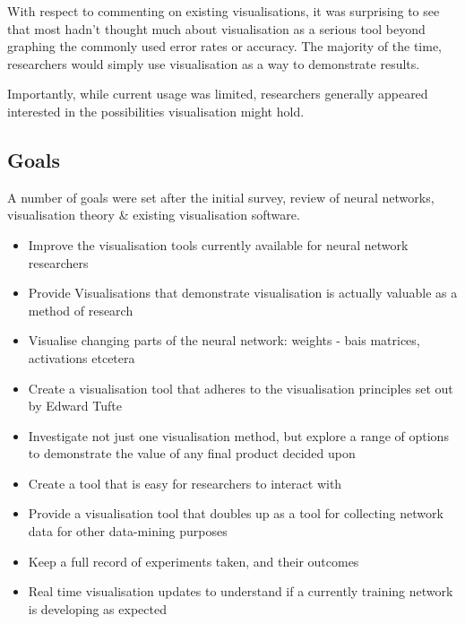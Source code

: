 \documentclass[a4paper,11pt,titlepage]{article}
\begin{document}
	\begin{figure}[H]
	\end{figure}
	
	With respect to commenting on existing visualisations, it was surprising to see that most hadn't thought much about visualisation as a serious tool beyond graphing the commonly used error rates or accuracy. The majority of the time, researchers would simply use visualisation as a way to demonstrate results.
	\par 
	Importantly, while current usage was limited, researchers generally appeared interested in the possibilities visualisation might hold.

	\subsection{Goals}	
	A number of goals were set after the initial survey, review of neural networks, visualisation theory \& existing visualisation software.
	\par 
	\begin{itemize}
		\item Improve the visualisation tools currently available for neural network researchers
		\item Provide Visualisations that demonstrate visualisation is actually valuable as a method of research
		\item Visualise changing parts of the neural network: weights - bais matrices, activations etcetera
			 \item Create a visualisation tool that adheres to the visualisation principles set out by Edward Tufte
			\item Investigate not just one visualisation method, but explore a range of options to demonstrate the value of any final product decided upon
			\item Create a tool that is easy for researchers to interact with
			\item Provide a visualisation tool that doubles up as a tool for collecting network data for other data-mining purposes
			\item Keep a full record of experiments taken, and their outcomes
			\item Real time visualisation updates to understand if a currently training network is developing as expected
	\end{itemize}	
\end{document}
